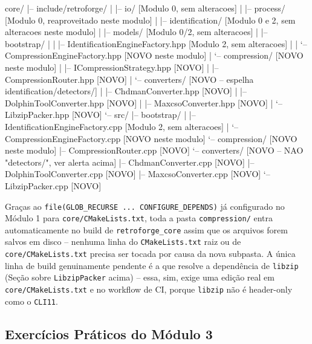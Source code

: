 \begin{CaixaArvore}
core/
|-- include/retroforge/
|   |-- io/                              [Modulo 0, sem alteracoes]
|   |-- process/                         [Modulo 0, reaproveitado neste modulo]
|   |-- identification/                  [Modulo 0 e 2, sem alteracoes neste modulo]
|   |-- models/                          [Modulo 0/2, sem alteracoes]
|   |-- bootstrap/
|   |   |-- IdentificationEngineFactory.hpp   [Modulo 2, sem alteracoes]
|   |   `-- CompressionEngineFactory.hpp      [NOVO neste modulo]
|   `-- compression/                     [NOVO neste modulo]
|       |-- ICompressionStrategy.hpp     [NOVO]
|       |-- CompressionRouter.hpp        [NOVO]
|       `-- converters/                  [NOVO -- espelha identification/detectors/]
|           |-- ChdmanConverter.hpp      [NOVO]
|           |-- DolphinToolConverter.hpp [NOVO]
|           |-- MaxcsoConverter.hpp      [NOVO]
|           `-- LibzipPacker.hpp         [NOVO]
`-- src/
    |-- bootstrap/
    |   |-- IdentificationEngineFactory.cpp   [Modulo 2, sem alteracoes]
    |   `-- CompressionEngineFactory.cpp      [NOVO neste modulo]
    `-- compression/                     [NOVO neste modulo]
        |-- CompressionRouter.cpp        [NOVO]
        `-- converters/                  [NOVO -- NAO "detectors/", ver alerta acima]
            |-- ChdmanConverter.cpp      [NOVO]
            |-- DolphinToolConverter.cpp [NOVO]
            |-- MaxcsoConverter.cpp      [NOVO]
            `-- LibzipPacker.cpp         [NOVO]
\end{CaixaArvore}

\begin{CaixaInfo}
Graças ao \texttt{file(GLOB\_RECURSE ... CONFIGURE\_DEPENDS)} já configurado no Módulo 1 para \texttt{core/CMakeLists.txt}, toda a pasta \texttt{compression/} entra automaticamente no build de \texttt{retroforge\_core} assim que os arquivos forem salvos em disco -- nenhuma linha do \texttt{CMakeLists.txt} raiz ou de \texttt{core/CMakeLists.txt} precisa ser tocada por causa da nova subpasta. A única linha de build genuinamente pendente é a que resolve a dependência de \texttt{libzip} (Seção sobre \texttt{LibzipPacker} acima) -- essa, sim, exige uma edição real em \texttt{core/CMakeLists.txt} e no workflow de CI, porque \texttt{libzip} não é header-only como o \texttt{CLI11}.
\end{CaixaInfo}

\subsection{Exercícios Práticos do Módulo 3}

